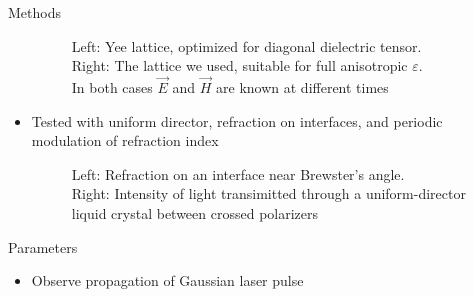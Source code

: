 \documentclass[8pt]{beamer}
\newlength{\wideitemsep}
\let\olditem\item
\renewcommand{\item}{\setlength{\itemsep}{\wideitemsep}\olditem}
\newcommand{\blockpadding}{
  \rule[-0.6ex]{0pt}{2.5ex}
}
\begin{document}
\begin{columns}[t]
\begin{column}{.36\textwidth}
\begin{block}{\blockpadding Methods}
\begin{itemize}
\begin{figure}[h]
{}
\label{fig:lattice}
\caption{{\color{dark} Left:} Yee lattice, optimized for diagonal dielectric tensor. \\{\color{dark} Right:} The lattice we used, suitable for full anisotropic $\varepsilon$. \\In both cases $\vec E$ and $\vec H$ are known at different times}
\end{figure}
  \item Tested with uniform director, refraction on interfaces, and periodic modulation of refraction index
  \vspace{-2ex}
  \begin{figure}[h]
   \centering
   \subfigure{\scalebox{0.77}{}}
   \subfigure{\scalebox{0.7}{}}
   \caption{{\color{dark} Left:} Refraction on an interface near Brewster's angle. \\{\color{dark} Right:} Intensity of light transimitted through a uniform-director liquid crystal between crossed polarizers}
  \end{figure}
  \vspace{-2ex}
    \end{itemize}
  \end{block}
  
  \begin{block}{\blockpadding Parameters}
  \begin{itemize}
  \item Observe propagation of Gaussian laser pulse


\end{itemize}
\end{block}
\end{column}
\end{columns}
\end{document}
